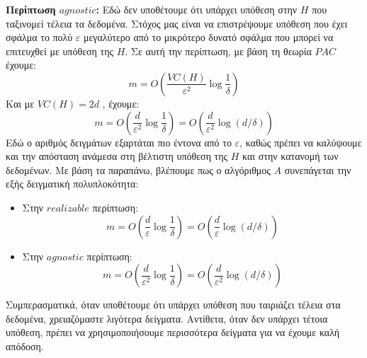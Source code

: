 \documentclass[12pt]{article}
\begin{document}
\vspace{0.5em}
\textbf{Περίπτωση $agnostic$:}
Εδώ δεν υποθέτουμε ότι υπάρχει υπόθεση στην $H$ που ταξινομεί τέλεια τα δεδομένα. Στόχος μας είναι να επιστρέψουμε υπόθεση που έχει σφάλμα το πολύ $\varepsilon$ μεγαλύτερο από το μικρότερο δυνατό σφάλμα που μπορεί να επιτευχθεί με υπόθεση της $H$. Σε αυτή την περίπτωση, με βάση τη θεωρία $PAC$ έχουμε:
\[
m = O\left( \frac{VC(H)}{\varepsilon^2} \log \frac{1}{\delta} \right)
\]
Και με $VC(H) = 2d$ , έχουμε:
\[
m = O\left( \frac{d}{\varepsilon^2} \log \frac{1}{\delta} \right) =  O\left( \frac{d}{\varepsilon^2} \log(d/\delta) \right)
\]
Εδώ ο αριθμός δειγμάτων εξαρτάται πιο έντονα από το $\varepsilon$, καθώς πρέπει να καλύψουμε και την απόσταση ανάμεσα στη βέλτιστη υπόθεση της $H$ και στην κατανομή των δεδομένων. Με βάση τα παραπάνω, βλέπουμε πως ο αλγόριθμος $A$ συνεπάγεται την εξής δειγματική πολυπλοκότητα:
\begin{itemize}
  \item Στην $realizable$ περίπτωση:
  \[
  m = O\left( \frac{d}{\varepsilon} \log \frac{1}{\delta} \right) = O\left( \frac{d}{\varepsilon} \log(d/\delta) \right)
  \]
  \item Στην $agnostic$ περίπτωση:
  \[
  m = O\left( \frac{d}{\varepsilon^2} \log \frac{1}{\delta} \right) = O\left( \frac{d}{\varepsilon^2} \log(d/\delta) \right)
  \]
\end{itemize}
Συμπερασματικά, όταν υποθέτουμε ότι υπάρχει υπόθεση που ταιριάζει τέλεια στα δεδομένα, χρειαζόμαστε λιγότερα δείγματα. Αντίθετα, όταν δεν υπάρχει τέτοια υπόθεση, πρέπει να χρησιμοποιήσουμε περισσότερα δείγματα για να έχουμε καλή απόδοση.
\end{document}
